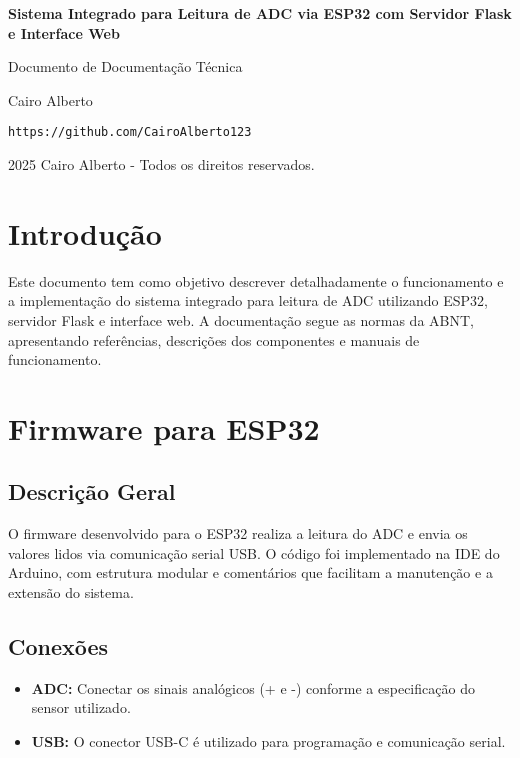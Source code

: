 \documentclass[12pt,a4paper]{article}
\begin{document}
\begin{titlepage}
    \centering
    \vspace*{2cm}
    {\LARGE \textbf{Sistema Integrado para Leitura de ADC via ESP32 com Servidor Flask e Interface Web}\par}
    \vspace{2cm}
    {\Large Documento de Documentação Técnica\par}
    \vspace{2cm}
    {\large Cairo Alberto \par}
    {\large \texttt{https://github.com/CairoAlberto123} \par}
    \vfill
    {\large 2025 Cairo Alberto - Todos os direitos reservados.\par}
\end{titlepage}

\tableofcontents
\newpage

\section{Introdução}
Este documento tem como objetivo descrever detalhadamente o funcionamento e a implementação do sistema integrado para leitura de ADC utilizando ESP32, servidor Flask e interface web. A documentação segue as normas da ABNT, apresentando referências, descrições dos componentes e manuais de funcionamento.

\section{Firmware para ESP32}
\subsection{Descrição Geral}
O firmware desenvolvido para o ESP32 realiza a leitura do ADC e envia os valores lidos via comunicação serial USB. O código foi implementado na IDE do Arduino, com estrutura modular e comentários que facilitam a manutenção e a extensão do sistema.

\subsection{Conexões}
\begin{itemize}
    \item \textbf{ADC:} Conectar os sinais analógicos (+ e -) conforme a especificação do sensor utilizado.
    \item \textbf{USB:} O conector USB-C é utilizado para programação e comunicação serial.
\end{itemize}
\end{document}
